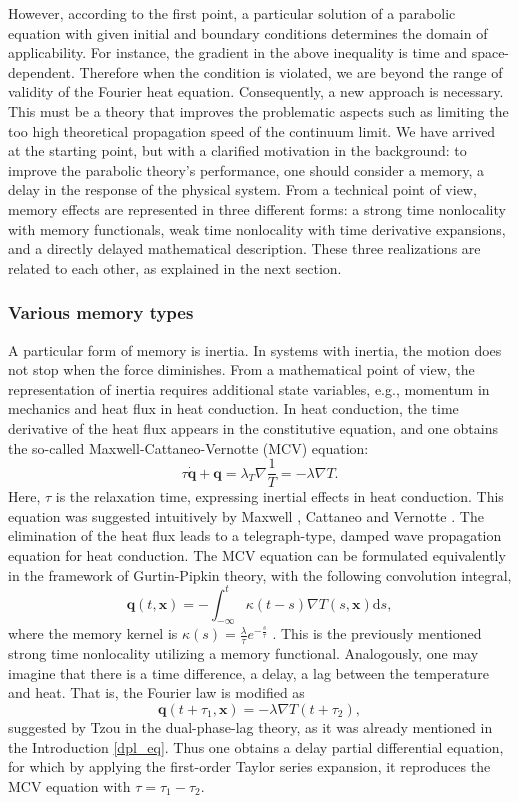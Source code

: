 \documentclass[sn-mathphys]{sn-jnl}%
\theoremstyle{thmstyleone}%
\theoremstyle{thmstyletwo}%
\theoremstyle{thmstylethree}%
\begin{document}
{However, according to the first point, a particular solution of a parabolic equation with given initial and boundary conditions determines the domain of applicability. For instance, the gradient in the above inequality is time and space-dependent. Therefore when the condition is violated, we are beyond the range of validity of the Fourier heat equation. Consequently, a new approach is necessary. This must be a theory that improves the problematic aspects such as limiting the too high theoretical propagation speed of the continuum limit. We have arrived at the starting point, but with a clarified motivation in the background: to improve the parabolic theory's performance, one should consider a memory, a delay in the response of the physical system. { From a technical point of view, memory effects are represented in three different forms: a strong time nonlocality with memory functionals, weak time nonlocality with time derivative expansions, and a directly delayed mathematical description. These three realizations are related to each other, as explained in the next section.}

\subsubsection{Various memory types}
A particular form of memory is inertia. In systems with inertia, the motion does not stop when the force diminishes. { From a mathematical point of view, the representation of inertia requires additional state variables, e.g., momentum in mechanics and heat flux in heat conduction. In heat conduction, the time derivative of the heat flux appears in the constitutive equation, and one obtains the so-called Maxwell-Cattaneo-Vernotte (MCV) equation}:
\begin{equation}
\tau \dot {\mathbf q}+\mathbf{q} = \lambda_T \nabla \frac{1}{T} = - \lambda \nabla T.
\label{MCV}\end{equation}
Here, $\tau$ is the relaxation time, expressing inertial effects in heat conduction. This equation was suggested intuitively by Maxwell \cite{Max867a}, Cattaneo \cite{Cat48a} and Vernotte \cite{Ver58a1}. The elimination of the heat flux leads to a telegraph-type, damped wave propagation equation for heat conduction. The MCV equation can be formulated equivalently in the framework of Gurtin-Pipkin theory, with the following convolution integral,
$$
\mathbf{q}(t,\mathbf{x}) = - \int_{-\infty}^t \kappa(t-s) \nabla T(s,\mathbf{x}) \textrm{d}s,
$$
where the memory kernel is $\kappa(s) =
\frac{\lambda}{\tau} e^{-\frac{s}{\tau}}$ \cite{ColGur67a,GurPip68a,FabLaz14a}. This is the previously mentioned strong time nonlocality utilizing a memory functional. Analogously, one may imagine that there is a time difference, a delay, a lag between the temperature and heat. That is, the Fourier law is modified as
$$
\mathbf{q}(t+\tau_1,\mathbf{x}) = -\lambda \nabla T(t+\tau_2),
$$
{suggested by Tzou in the dual-phase-lag theory, as it was already mentioned in the Introduction \eqref{dpl_eq}}. Thus one obtains a delay partial differential equation, for which by applying the first-order Taylor series expansion, it reproduces the MCV equation with $\tau= \tau_1-\tau_2$.

}
\end{document}
